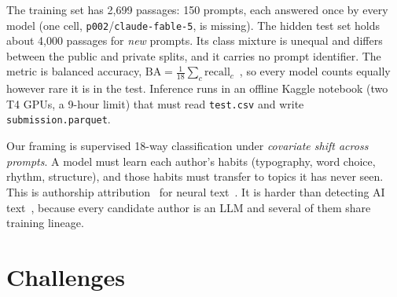 \documentclass[10pt,twocolumn,letterpaper]{article}
\newcommand{\BA}{\mathrm{BA}}
\begin{document}
The training set has 2,699 passages: 150 prompts, each answered once by every model (one cell, \texttt{p002}/\texttt{claude-fable-5}, is missing). The hidden test set holds about 4,000 passages for \emph{new} prompts. Its class mixture is unequal and differs between the public and private splits, and it carries no prompt identifier. The metric is balanced accuracy, $\BA = \frac{1}{18}\sum_{c} \mathrm{recall}_c$~\cite{brodersen2010}, so every model counts equally however rare it is in the test. Inference runs in an offline Kaggle notebook (two T4 GPUs, a 9-hour limit) that must read \texttt{test.csv} and write \texttt{submission.parquet}.

Our framing is supervised 18-way classification under \emph{covariate shift across prompts}. A model must learn each author's habits (typography, word choice, rhythm, structure), and those habits must transfer to topics it has never seen. This is authorship attribution~\cite{stamatatos2009} for neural text~\cite{uchendu2020}. It is harder than detecting AI text~\cite{mitchell2023detectgpt,bao2024fastdetectgpt}, because every candidate author is an LLM and several of them share training lineage.

\section{Challenges}
\label{sec:challenges}
\end{document}
